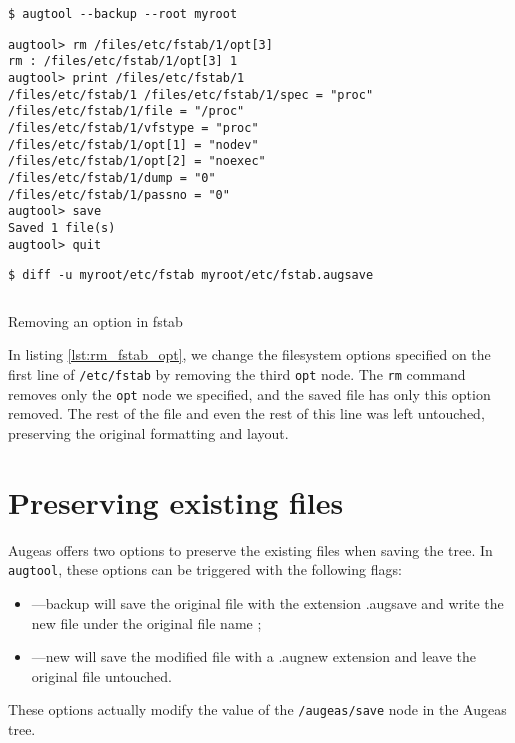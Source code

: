 \begin{listing}
  \begin{verbatim}
$ augtool --backup --root myroot
  \end{verbatim}
  \begin{verbatim}
augtool> rm /files/etc/fstab/1/opt[3]
rm : /files/etc/fstab/1/opt[3] 1
augtool> print /files/etc/fstab/1
/files/etc/fstab/1 /files/etc/fstab/1/spec = "proc"
/files/etc/fstab/1/file = "/proc"
/files/etc/fstab/1/vfstype = "proc"
/files/etc/fstab/1/opt[1] = "nodev"
/files/etc/fstab/1/opt[2] = "noexec"
/files/etc/fstab/1/dump = "0"
/files/etc/fstab/1/passno = "0"
augtool> save
Saved 1 file(s)
augtool> quit
  \end{verbatim}
  \begin{verbatim}
$ diff -u myroot/etc/fstab myroot/etc/fstab.augsave
  \end{verbatim}
  \inputminted{diff}{listings/fstab_opt.diff}
  \caption{Removing an option in fstab}
  \label{lst:rm_fstab_opt}
\end{listing}


In listing \ref{lst:rm_fstab_opt}, we change the filesystem options specified on the first line of \verb!/etc/fstab! by removing the third \verb!opt! node. The \verb!rm! command removes only the \verb!opt! node we specified, and the saved file has only this option removed. The rest of the file and even the rest of this line was left untouched, preserving the original formatting and layout.

\section{Preserving existing files}

  

Augeas offers two options to preserve the existing files when saving the tree. In \verb!augtool!, these options can be triggered with the following flags:

\begin{itemize}
\item
  ---backup will save the original file with the extension .augsave and write the new file under the original file name ;
\item
  ---new will save the modified file with a .augnew extension and leave the original file untouched.
\end{itemize}
These options actually modify the value of the \verb!/augeas/save! node in the Augeas tree.

